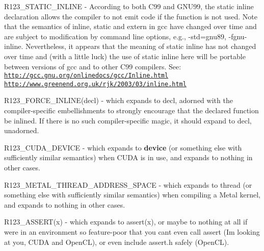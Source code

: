 \begin{DoxyItemize}
\item R123\+\_\+\+S\+T\+A\+T\+I\+C\+\_\+\+I\+N\+L\+I\+NE -\/ According to both C99 and G\+N\+U99, the \textquotesingle{}static inline\textquotesingle{} declaration allows the compiler to not emit code if the function is not used. Note that the semantics of \textquotesingle{}inline\textquotesingle{}, \textquotesingle{}static\textquotesingle{} and \textquotesingle{}extern\textquotesingle{} in gcc have changed over time and are subject to modification by command line options, e.\+g., -\/std=gnu89, -\/fgnu-\/inline. Nevertheless, it appears that the meaning of \textquotesingle{}static inline\textquotesingle{} has not changed over time and (with a little luck) the use of \textquotesingle{}static inline\textquotesingle{} here will be portable between versions of gcc and to other C99 compilers. See\+: \href{http://gcc.gnu.org/onlinedocs/gcc/Inline.html}{\tt http\+://gcc.\+gnu.\+org/onlinedocs/gcc/\+Inline.\+html} \href{http://www.greenend.org.uk/rjk/2003/03/inline.html}{\tt http\+://www.\+greenend.\+org.\+uk/rjk/2003/03/inline.\+html}


\item R123\+\_\+\+F\+O\+R\+C\+E\+\_\+\+I\+N\+L\+I\+N\+E(decl) -\/ which expands to \textquotesingle{}decl\textquotesingle{}, adorned with the compiler-\/specific embellishments to strongly encourage that the declared function be inlined. If there is no such compiler-\/specific magic, it should expand to decl, unadorned.


\item R123\+\_\+\+C\+U\+D\+A\+\_\+\+D\+E\+V\+I\+CE -\/ which expands to {\bfseries device} (or something else with sufficiently similar semantics) when C\+U\+DA is in use, and expands to nothing in other cases.


\item R123\+\_\+\+M\+E\+T\+A\+L\+\_\+\+T\+H\+R\+E\+A\+D\+\_\+\+A\+D\+D\+R\+E\+S\+S\+\_\+\+S\+P\+A\+CE -\/ which expands to \textquotesingle{}thread\textquotesingle{} (or something else with sufficiently similar semantics) when compiling a Metal kernel, and expands to nothing in other cases.


\item R123\+\_\+\+A\+S\+S\+E\+R\+T(x) -\/ which expands to assert(x), or maybe to nothing at all if we\textquotesingle{}re in an environment so feature-\/poor that you can\textquotesingle{}t even call assert (I\textquotesingle{}m looking at you, C\+U\+DA and Open\+CL), or even include assert.\+h safely (Open\+CL).



\end{DoxyItemize}
